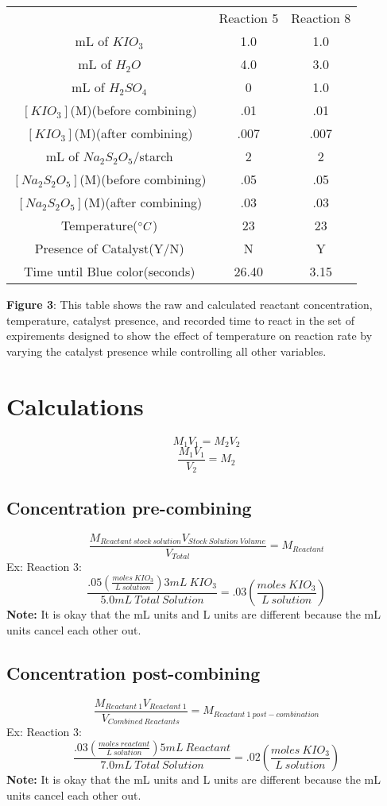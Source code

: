 \documentclass{article}
\begin{document}
\begin{table}[H]
    \begin{center}
    \begin{tabularx}{400pt}{c|c|c} & Reaction 5 & Reaction 8\\
    mL of $KIO_3$ & 1.0 & 1.0 \\
    mL of $H_2O$ & 4.0 & 3.0 \\
    mL of $H_2SO_4$ & 0 & 1.0 \\
    $[KIO_3]$(M)(before combining) & .01 & .01  \\
    $[KIO_3]$(M)(after combining) & .007 & .007 \\
    mL of $Na_2S_2O_5$/starch & 2 & 2 \\
    $[Na_2S_2O_5]$(M)(before combining) & .05 & .05 \\
    $[Na_2S_2O_5]$(M)(after combining) & .03 & .03 \\
    Temperature($\degree C$) & 23 & 23 \\
    Presence of Catalyst(Y/N) & N & Y \\
    Time until Blue color(seconds) & 26.40 & 3.15 \\

    \end{tabularx}
    \end{center}
\end{table}
\textbf{Figure 3}: This table shows the raw and calculated reactant concentration, temperature, catalyst presence, and recorded time to react in the set of expirements designed to show the effect of temperature on reaction rate by varying the catalyst presence while controlling all other variables.
$\ $
\section{Calculations}
$$M_1V_1 =M_2V_2$$
$$\frac{M_1V_1}{V_2} = M_2$$
\subsection{Concentration pre-combining}
$$\frac{M_{Reactant\ stock\ solution}V_{Stock\ Solution\ Volume}}{V_{Total}} = M_{Reactant}$$
Ex: Reaction 3: 
$$\frac{.05(\frac{moles\ KIO_3}{L\ solution})3mL\ KIO_3}{5.0mL\ Total\ Solution} = .03(\frac{moles\ KIO_3}{L\ solution}) $$
\textbf{Note:} It is okay that the mL units and L units are different because the mL units cancel each other out. 
\subsection{Concentration post-combining}
$$\frac{M_{Reactant\ 1}V_{Reactant\ 1}}{V_{Combined\ Reactants}} = M_{Reactant\ 1\ post-combination}$$
Ex: Reaction 3: 
$$\frac{.03(\frac{moles\ reactant}{L\ solution})5mL\ Reactant}{7.0mL\ Total\ Solution} = .02(\frac{moles\ KIO_3}{L\ solution}) $$
\textbf{Note:} It is okay that the mL units and L units are different because the mL units cancel each other out. 
\end{document}
